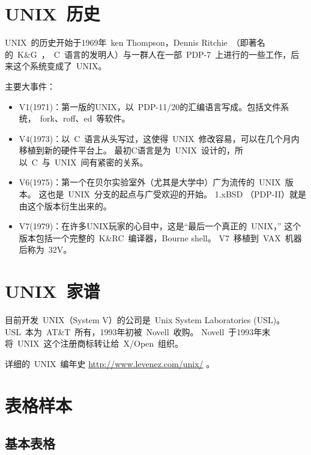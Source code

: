 \section{UNIX~历史}
\label{sec:history}
UNIX~的历史开始于1969年~ken Thompson，Dennis Ritchie~（即著名的~K\&G~，~C~语言的发明人）与一群人在一部~PDP-7~上进行的一些工作，后来这个系统变成了~UNIX。

主要大事件：
\begin{itemize}
  \item V1(1971)：第一版的UNIX，以~PDP-11/20的汇编语言写成。包括文件系统，~fork、roff、ed~等软件。
  \item V4(1973)：以~C~语言从头写过，这使得~UNIX~修改容易，可以在几个月内移植到新的硬件平台上。
        最初C语言是为~UNIX~设计的，所以~C~与~UNIX~间有紧密的关系。
  \item V6(1975)：第一个在贝尔实验室外（尤其是大学中）广为流传的~UNIX~版本。
        这也是~UNIX~分支的起点与广受欢迎的开始。
        1.xBSD （PDP-II）就是由这个版本衍生出来的。
  \item V7(1979)：在许多UNIX玩家的心目中，这是“最后一个真正的~UNIX，”
        这个版本包括一个完整的~K\&RC~编译器，Bourne shell。
        V7~移植到~VAX~机器后称为~32V。
\end{itemize}

\section{UNIX~家谱}
目前开发~UNIX（System V）的公司是~Unix System Laboratories (USL)。
USL~本为~AT\&T~所有，1993年初被~Novell~收购。
Novell~于1993年末将~UNIX~这个注册商标转让给~X/Open~组织。

\label{sec:family}

详细的~UNIX~编年史 \url{http://www.levenez.com/unix/} 。

\section{表格样本}
\label{chap1:sample:table}

\subsection{基本表格}
\label{sec:basictable}

